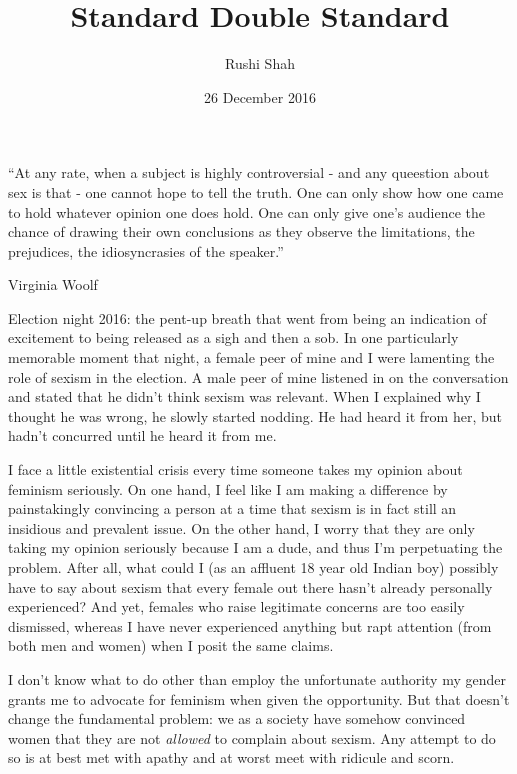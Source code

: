 \documentclass{article}
\author{Rushi Shah}
\date{26 December 2016}
\title{Standard Double Standard}
\begin{document}
\maketitle

	\epigraph{``At any rate, when a subject is highly controversial - and any queestion about sex is that - one cannot hope to tell the truth. One can only show how one came to hold whatever opinion one does hold. One can only give one's audience the chance of drawing their own conclusions as they observe the limitations, the prejudices, the idiosyncrasies of the speaker.''}{Virginia Woolf}


	Election night 2016: the pent-up breath that went from being an indication of excitement to being released as a sigh and then a sob. In one particularly memorable moment that night, a female peer of mine and I were lamenting the role of sexism in the election. A male peer of mine listened in on the conversation and stated that he didn't think sexism was relevant. When I explained why I thought he was wrong, he slowly started nodding. He had heard it from her, but hadn't concurred until he heard it from me. 

	I face a little existential crisis every time someone takes my opinion about feminism seriously. On one hand, I feel like I am making a difference by painstakingly convincing a person at a time that sexism is in fact still an insidious and prevalent issue. On the other hand, I worry that they are only taking my opinion seriously because I am a dude, and thus I'm perpetuating the problem. After all, what could I (as an affluent 18 year old Indian boy) possibly have to say about sexism that every female out there hasn't already personally experienced? And yet, females who raise legitimate concerns are too easily dismissed, whereas I have never experienced anything but rapt attention (from both men and women) when I posit the same claims.

	I don't know what to do other than employ the unfortunate authority my gender grants me to advocate for feminism when given the opportunity. But that doesn't change the fundamental problem: we as a society have somehow convinced women that they are not \textit{allowed} to complain about sexism. Any attempt to do so is at best met with apathy and at worst meet with ridicule and scorn.
\end{document}
